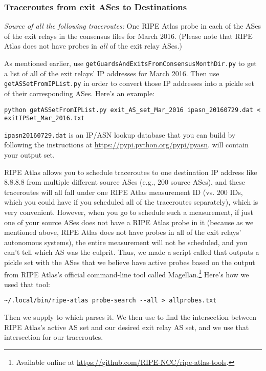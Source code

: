 \documentclass{article}
\begin{document}
\subsubsection{Traceroutes from exit ASes to Destinations}
\emph{Source of all the following traceroutes:} One RIPE Atlas probe in each of the ASes of the
exit relays in the consensus files for March 2016. (Please note that RIPE Atlas does not
have probes in \emph{all} of the exit relay ASes.)

As mentioned earlier, use {\tt getGuardsAndExitsFromConsensusMonthDir.py} to get a
list of all of the exit relays' IP addresses for March 2016.
Then use {\tt getASSetFromIPList.py}
in order to convert those IP addresses into a pickle set
of their corresponding ASes. Here's an example:
\begin{lstlisting}
python getASSetFromIPList.py exit_AS_set_Mar_2016 ipasn_20160729.dat < exitIPSet_Mar_2016.txt
\end{lstlisting}
{\tt ipasn\textunderscore 20160729.dat} is an IP/ASN lookup database that you can build
by following the instructions at \url{https://pypi.python.org/pypi/pyasn}.
 will contain your output set.

RIPE Atlas allows you to schedule traceroutes to one destination IP address
like 8.8.8.8 from multiple different source ASes (e.g., 200 source ASes), and these
traceroutes will all fall under one RIPE Atlas measurement ID (vs. 200 IDs, which
you could have if you scheduled all of the traceroutes separately), which is very
convenient. However, when you go to schedule such a measurement, if just one of your
source ASes does not have a RIPE Atlas probe in it (because as we mentioned above,
RIPE Atlas does not have probes in all of the exit relays' autonomous systems),
the entire measurement will not be
scheduled, and you can't tell which AS was the culprit. Thus, we made a script
called  that outputs a pickle set with the
ASes that we believe have active probes based on the output from RIPE Atlas's
official command-line tool called Magellan.\footnote{Available online at
\url{https://github.com/RIPE-NCC/ripe-atlas-tools}.}
Here's how we used that tool:
\begin{lstlisting}
~/.local/bin/ripe-atlas probe-search --all > allprobes.txt
\end{lstlisting}
Then we supply  to  which
parses it. We then use 
to find the intersection
between RIPE Atlas's active AS set and our desired exit relay AS set, and
we use that intersection for our traceroutes.
\end{document}
